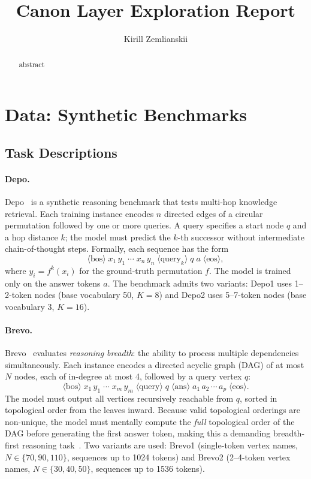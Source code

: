 \documentclass{article}
\title{Canon Layer Exploration Report}
\author{Kirill Zemlianskii}
\begin{document}
\maketitle

\begin{abstract}
  abstract
\end{abstract}

\section{Data: Synthetic Benchmarks}
\label{sec:data}

\subsection{Task Descriptions}
\label{sec:data:tasks}

\paragraph{Depo.}
Depo~\cite{allen_zhu_physics4} is a synthetic reasoning benchmark that tests multi-hop
knowledge retrieval. Each training instance encodes $n$ directed edges of a circular
permutation followed by one or more queries. A query specifies a start node $q$ and a hop
distance $k$; the model must predict the $k$-th successor without intermediate chain-of-thought
steps. Formally, each sequence has the form
\[
  \langle\text{bos}\rangle\; x_1\,y_1\;\cdots\; x_n\,y_n\;
  \langle\text{query}_k\rangle\; q\; a\; \langle\text{eos}\rangle,
\]
where $y_i = f^k(x_i)$ for the ground-truth permutation $f$. The model is trained only on
the answer tokens $a$. The benchmark admits two variants: Depo1 uses 1--2-token nodes
(base vocabulary 50, $K{=}8$) and Depo2 uses 5--7-token nodes (base vocabulary 3,
$K{=}16$).

\paragraph{Brevo.}
Brevo~\cite{allen_zhu_physics4} evaluates \emph{reasoning breadth}: the ability to
process multiple dependencies simultaneously. Each instance encodes a
directed acyclic graph (DAG) of at most $N$ nodes, each of in-degree at most 4, followed
by a query vertex $q$:
\[
  \langle\text{bos}\rangle\; x_1\,y_1\;\cdots\; x_m\,y_m\;
  \langle\text{query}\rangle\; q\;
  \langle\text{ans}\rangle\; a_1\,a_2\,\cdots\,a_p\; \langle\text{eos}\rangle.
\]
The model must output all vertices recursively reachable from $q$, sorted in topological
order from the leaves inward. Because valid topological orderings are non-unique, the
model must mentally compute the \emph{full} topological order of the DAG before
generating the first answer token, making this a demanding breadth-first reasoning
task~\cite{allen_zhu_physics4}. Two variants are used: Brevo1 (single-token vertex
names, $N \in \{70, 90, 110\}$, sequences up to 1024 tokens) and Brevo2 (2--4-token
vertex names, $N \in \{30, 40, 50\}$, sequences up to 1536 tokens).
\end{document}
